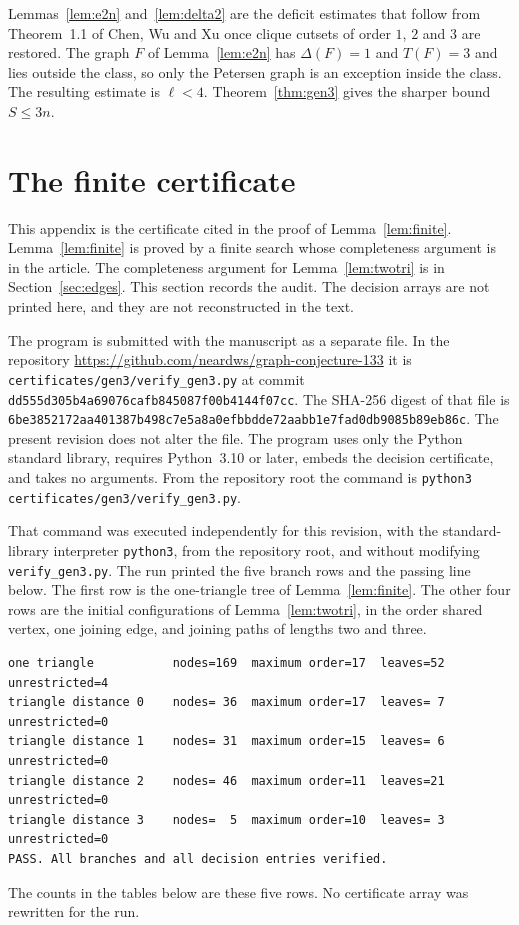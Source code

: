 \documentclass[ASNA]{USG}
\theoremstyle{WBstyletwo}
\numberwithin{equation}{section}
\newcommand{\lr}{\ell}
\begin{document}
\begin{remark}\label{rem:cwx}
Lemmas~\ref{lem:e2n} and~\ref{lem:delta2} are the deficit estimates that follow from Theorem~1.1 of Chen, Wu and Xu once clique cutsets of order $1$, $2$ and $3$ are restored. The graph $F$ of Lemma~\ref{lem:e2n} has $\Delta(F)=1$ and $T(F)=3$ and lies outside the class, so only the Petersen graph is an exception inside the class. The resulting estimate is $\lr<4$. Theorem~\ref{thm:gen3} gives the sharper bound $S\le 3n$.
\end{remark}

\appendix

\section{The finite certificate}\label{sec:certificate}

This appendix is the certificate cited in the proof of Lemma~\ref{lem:finite}. Lemma~\ref{lem:finite} is proved by a finite search whose completeness argument is in the article. The completeness argument for Lemma~\ref{lem:twotri} is in Section~\ref{sec:edges}. This section records the audit. The decision arrays are not printed here, and they are not reconstructed in the text.

The program is submitted with the manuscript as a separate file. In the repository \url{https://github.com/neardws/graph-conjecture-133} it is \texttt{certificates/gen3/verify\_gen3.py} at commit \texttt{dd555d305b4a69076cafb845087f00b4144f07cc}. The SHA-256 digest of that file is \texttt{6be3852172aa401387b498c7e5a8a0efbbdde72aabb1e7fad0db9085b89eb86c}. The present revision does not alter the file. The program uses only the Python standard library, requires Python~3.10 or later, embeds the decision certificate, and takes no arguments. From the repository root the command is \texttt{python3 certificates/gen3/verify\_gen3.py}.

That command was executed independently for this revision, with the standard-library interpreter \texttt{python3}, from the repository root, and without modifying \texttt{verify\_gen3.py}. The run printed the five branch rows and the passing line below. The first row is the one-triangle tree of Lemma~\ref{lem:finite}. The other four rows are the initial configurations of Lemma~\ref{lem:twotri}, in the order shared vertex, one joining edge, and joining paths of lengths two and three.
\begin{verbatim}
one triangle           nodes=169  maximum order=17  leaves=52  unrestricted=4
triangle distance 0    nodes= 36  maximum order=17  leaves= 7  unrestricted=0
triangle distance 1    nodes= 31  maximum order=15  leaves= 6  unrestricted=0
triangle distance 2    nodes= 46  maximum order=11  leaves=21  unrestricted=0
triangle distance 3    nodes=  5  maximum order=10  leaves= 3  unrestricted=0
PASS. All branches and all decision entries verified.
\end{verbatim}
The counts in the tables below are these five rows. No certificate array was rewritten for the run.
\end{document}
